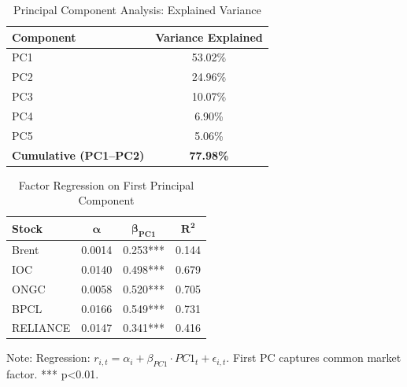 \documentclass[11pt]{article}
\begin{document}
\begin{table}[htbp]
\centering
\caption{Principal Component Analysis: Explained Variance}
\label{tab:pca}
\begin{tabular}{lc}
\toprule
\textbf{Component} & \textbf{Variance Explained} \\
\midrule
PC1 & 53.02\% \\
PC2 & 24.96\% \\
PC3 & 10.07\% \\
PC4 & 6.90\% \\
PC5 & 5.06\% \\
\midrule
\textbf{Cumulative (PC1--PC2)} & \textbf{77.98\%} \\
\bottomrule
\end{tabular}
\end{table}

\begin{table}[htbp]
\centering
\caption{Factor Regression on First Principal Component}
\label{tab:pca_regression}
\begin{tabular}{lccc}
\toprule
\textbf{Stock} & $\boldsymbol{\alpha}$ & $\boldsymbol{\beta_{PC1}}$ & $\boldsymbol{R^2}$ \\
\midrule
Brent     & 0.0014 & 0.253*** & 0.144 \\
IOC       & 0.0140 & 0.498*** & 0.679 \\
ONGC      & 0.0058 & 0.520*** & 0.705 \\
BPCL      & 0.0166 & 0.549*** & 0.731 \\
RELIANCE  & 0.0147 & 0.341*** & 0.416 \\
\bottomrule
\end{tabular}
\begin{tablenotes}
\small
\item Note: Regression: $r_{i,t} = \alpha_i + \beta_{PC1} \cdot PC1_t + \epsilon_{i,t}$. First PC captures common market factor. *** p<0.01.
\end{tablenotes}
\end{table}
\end{document}
